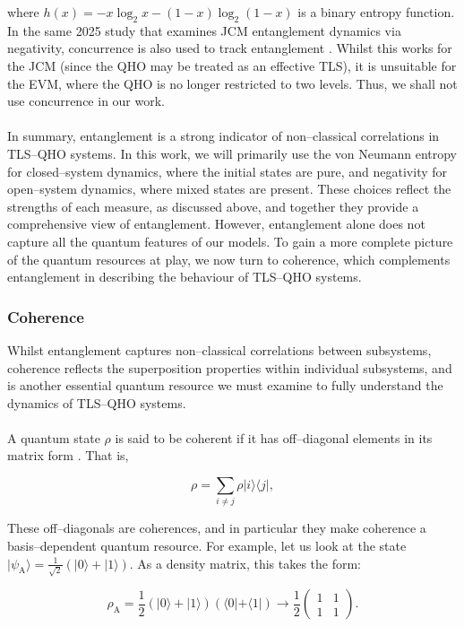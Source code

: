 \documentclass[11pt]{article}
\begin{document}
where $h(x) = - x\log_2x - (1 - x)\log_2(1 -x)$ is a binary entropy function. In the same 2025 study that examines JCM entanglement dynamics via negativity, concurrence is also used to track entanglement \cite{Entanglement2025-Negativity}. Whilst this works for the JCM (since the QHO may be treated as an effective TLS), it is unsuitable for the EVM, where the QHO is no longer restricted to two levels. Thus, we shall not use concurrence in our work.\\
\\
In summary, entanglement is a strong indicator of non--classical correlations in TLS--QHO systems. In this work, we will primarily use the von Neumann entropy for closed--system dynamics, where the initial states are pure, and negativity for open--system dynamics, where mixed states are present. These choices reflect the strengths of each measure, as discussed above, and together they provide a comprehensive view of entanglement. However, entanglement alone does not capture all the quantum features of our models. To gain a more complete picture of the quantum resources at play, we now turn to coherence, which complements entanglement in describing the behaviour of TLS--QHO systems.

\subsubsection{Coherence} \label{sec:theory_sub_coh}

Whilst entanglement captures non--classical correlations between subsystems, coherence reflects the superposition properties within individual subsystems, and is another essential quantum resource we must examine to fully understand the dynamics of TLS--QHO systems.\\
\\
A quantum state $\rho$ is said to be coherent if it has off--diagonal elements in its matrix form \cite{Coherence2017-Colloquium}. That is,

\begin{equation}
    \rho = \sum_{i\neq j}\rho|i\rangle\langle j|,
\end{equation}

These off--diagonals are coherences, and in particular they make coherence a basis--dependent quantum resource. For example, let us look at the state $|\psi_{\scriptscriptstyle \text{A}}\rangle = \frac{1}{\sqrt{2}}(|0\rangle + |1\rangle)$. As a density matrix, this takes the form:

\begin{equation*}
    \rho_{\scriptscriptstyle \text{A}} = \frac{1}{2}(|0\rangle + |1\rangle)(\langle0| +\langle1|) \rightarrow \frac{1}{2}
    \begin{pmatrix}
        1 & 1 \\
        1 & 1
    \end{pmatrix}.
\end{equation*}
\end{document}
